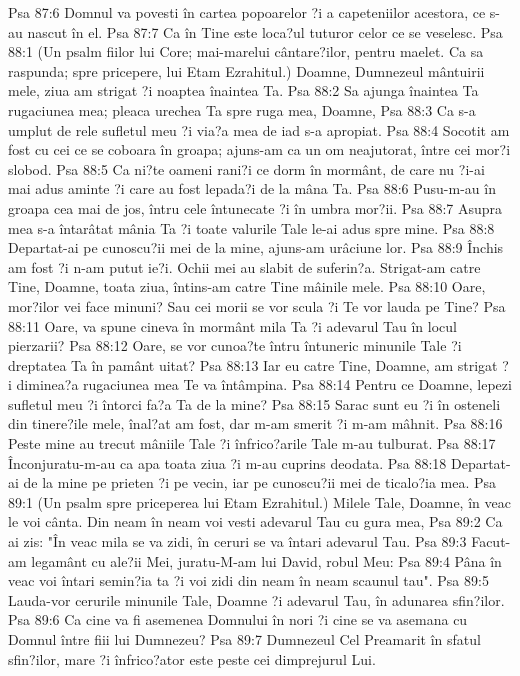Psa 87:6  Domnul va povesti în cartea popoarelor ?i a capeteniilor acestora, ce s-au nascut în el.
Psa 87:7  Ca în Tine este loca?ul tuturor celor ce se veselesc.
Psa 88:1  (Un psalm fiilor lui Core; mai-marelui cântare?ilor, pentru maelet. Ca sa raspunda; spre pricepere, lui Etam Ezrahitul.) Doamne, Dumnezeul mântuirii mele, ziua am strigat ?i noaptea înaintea Ta.
Psa 88:2  Sa ajunga înaintea Ta rugaciunea mea; pleaca urechea Ta spre ruga mea, Doamne,
Psa 88:3  Ca s-a umplut de rele sufletul meu ?i via?a mea de iad s-a apropiat.
Psa 88:4  Socotit am fost cu cei ce se coboara în groapa; ajuns-am ca un om neajutorat, între cei mor?i slobod.
Psa 88:5  Ca ni?te oameni rani?i ce dorm în mormânt, de care nu ?i-ai mai adus aminte ?i care au fost lepada?i de la mâna Ta.
Psa 88:6  Pusu-m-au în groapa cea mai de jos, întru cele întunecate ?i în umbra mor?ii.
Psa 88:7  Asupra mea s-a întarâtat mânia Ta ?i toate valurile Tale le-ai adus spre mine.
Psa 88:8  Departat-ai pe cunoscu?ii mei de la mine, ajuns-am urâciune lor.
Psa 88:9  Închis am fost ?i n-am putut ie?i. Ochii mei au slabit de suferin?a. Strigat-am catre Tine, Doamne, toata ziua, întins-am catre Tine mâinile mele.
Psa 88:10  Oare, mor?ilor vei face minuni? Sau cei morii se vor scula ?i Te vor lauda pe Tine?
Psa 88:11  Oare, va spune cineva în mormânt mila Ta ?i adevarul Tau în locul pierzarii?
Psa 88:12  Oare, se vor cunoa?te întru întuneric minunile Tale ?i dreptatea Ta în pamânt uitat?
Psa 88:13  Iar eu catre Tine, Doamne, am strigat ?i diminea?a rugaciunea mea Te va întâmpina.
Psa 88:14  Pentru ce Doamne, lepezi sufletul meu ?i întorci fa?a Ta de la mine?
Psa 88:15  Sarac sunt eu ?i în osteneli din tinere?ile mele, înal?at am fost, dar m-am smerit ?i m-am mâhnit.
Psa 88:16  Peste mine au trecut mâniile Tale ?i înfrico?arile Tale m-au tulburat.
Psa 88:17  Înconjuratu-m-au ca apa toata ziua ?i m-au cuprins deodata.
Psa 88:18  Departat-ai de la mine pe prieten ?i pe vecin, iar pe cunoscu?ii mei de ticalo?ia mea.
Psa 89:1  (Un psalm spre priceperea lui Etam Ezrahitul.) Milele Tale, Doamne, în veac le voi cânta. Din neam în neam voi vesti adevarul Tau cu gura mea,
Psa 89:2  Ca ai zis: "În veac mila se va zidi, în ceruri se va întari adevarul Tau.
Psa 89:3  Facut-am legamânt cu ale?ii Mei, juratu-M-am lui David, robul Meu:
Psa 89:4  Pâna în veac voi întari semin?ia ta ?i voi zidi din neam în neam scaunul tau".
Psa 89:5  Lauda-vor cerurile minunile Tale, Doamne ?i adevarul Tau, în adunarea sfin?ilor.
Psa 89:6  Ca cine va fi asemenea Domnului în nori ?i cine se va asemana cu Domnul între fiii lui Dumnezeu?
Psa 89:7  Dumnezeul Cel Preamarit în sfatul sfin?ilor, mare ?i înfrico?ator este peste cei dimprejurul Lui.
